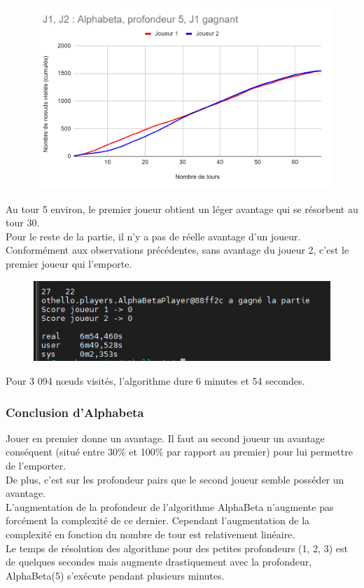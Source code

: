 \documentclass[12pt]{article}
\begin{document}
\begin{figure}[!h]
   \includegraphics[width=\textwidth]{prof5alphabeta.png}
\end{figure}

Au tour 5 environ, le premier joueur obtient un léger avantage qui se résorbent au tour 30.\\
Pour le reste de la partie, il n’y a pas de réelle avantage d’un joueur.\\
Conformément aux observations précédentes, sans avantage du joueur 2, c’est le premier joueur qui l’emporte.

\begin{figure}[!h]
   \includegraphics[width=\textwidth]{prof5alphabeta-console.png}
\end{figure}

Pour 3 094 nœuds visités, l’algorithme dure 6 minutes et 54 secondes. 

\subsubsection{Conclusion d’Alphabeta}

Jouer en premier donne un avantage. Il faut au second joueur un avantage conséquent (situé entre 30\% et 100\% par rapport au premier) pour lui permettre de l’emporter.\\
De plus, c’est sur les profondeur pairs que le second joueur semble posséder un avantage.\\
L’augmentation de la profondeur de l’algorithme AlphaBeta n’augmente pas forcément la complexité de ce dernier. Cependant l’augmentation de la complexité en fonction du nombre de tour est relativement linéaire.\\
Le temps de résolution des algorithme pour des petites profondeurs (1, 2, 3) est de quelques secondes mais augmente drastiquement avec la profondeur, AlphaBeta(5) s’exécute pendant plusieurs minutes. 
\end{document}

